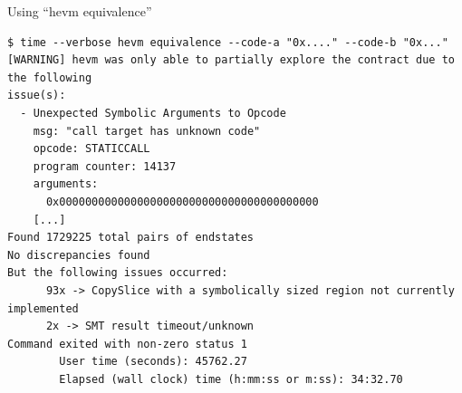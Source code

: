 \documentclass[aspectratio=169]{beamer}
\begin{document}
\begin{frame}[fragile=singleslide]{Using ``hevm equivalence''}
\begin{Verbatim}[frame=single, framerule=0.2mm, framesep=2mm,fontsize=\footnotesize]
$ time --verbose hevm equivalence --code-a "0x...." --code-b "0x..."
[WARNING] hevm was only able to partially explore the contract due to the following
issue(s):
  - Unexpected Symbolic Arguments to Opcode
    msg: "call target has unknown code"
    opcode: STATICCALL
    program counter: 14137
    arguments:
      0x0000000000000000000000000000000000000000
    [...]
Found 1729225 total pairs of endstates
No discrepancies found
But the following issues occurred:
      93x -> CopySlice with a symbolically sized region not currently implemented
      2x -> SMT result timeout/unknown
Command exited with non-zero status 1
        User time (seconds): 45762.27
        Elapsed (wall clock) time (h:mm:ss or m:ss): 34:32.70
\end{Verbatim}
\end{frame}
\end{document}

